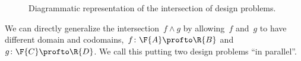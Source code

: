 \begin{figure}[h!]
    \begin{center}
    \end{center}
    \caption{Diagrammatic representation of the intersection of design problems. \label{fig:intersectiondp}}
\end{figure}

We can directly generalize the intersection~$f \wedge g$ by allowing~$f$ and~$g$ to have different domain and codomains,~$f \colon \F{A} \profto \R{B}$ and~$g \colon \F{C} \profto \R{D}$. We call this putting two design problems ``in parallel''.
